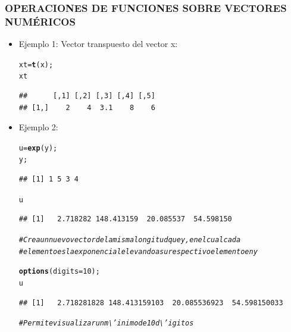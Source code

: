 \documentclass[12pt,letterpaper]{article}\usepackage[]{graphicx}\usepackage[]{color}
\makeatletter
\newcommand{\hlnum}[1]{\textcolor[rgb]{0.686,0.059,0.569}{#1}}%
\newcommand{\hlcom}[1]{\textcolor[rgb]{0.678,0.584,0.686}{\textit{#1}}}%
\newcommand{\hlstd}[1]{\textcolor[rgb]{0.345,0.345,0.345}{#1}}%
\newcommand{\hlkwb}[1]{\textcolor[rgb]{0.69,0.353,0.396}{#1}}%
\newcommand{\hlkwc}[1]{\textcolor[rgb]{0.333,0.667,0.333}{#1}}%
\newcommand{\hlkwd}[1]{\textcolor[rgb]{0.737,0.353,0.396}{\textbf{#1}}}%
\newenvironment{kframe}{%
 \def\at@end@of@kframe{}%
 \ifinner\ifhmode%
  \def\at@end@of@kframe{\end{minipage}}%
  \begin{minipage}{\columnwidth}%
 \fi\fi%
 \def\FrameCommand##1{\hskip\@totalleftmargin \hskip-\fboxsep
 \colorbox{shadecolor}{##1}\hskip-\fboxsep
     \hskip-\linewidth \hskip-\@totalleftmargin \hskip\columnwidth}%
 \MakeFramed {\advance\hsize-\width
   \@totalleftmargin\z@ \linewidth\hsize
   \@setminipage}}%
 {\par\unskip\endMakeFramed%
 \at@end@of@kframe}
\newenvironment{knitrout}{}{} %
\makeatother
\begin{document}
\subsubsection{OPERACIONES DE FUNCIONES SOBRE VECTORES NUM\'ERICOS}
\begin{itemize}
\item Ejemplo 1: Vector transpuesto del vector x:
\begin{knitrout}
\color{fgcolor}\begin{kframe}
\begin{alltt}
\hlstd{xt} \hlkwb{=} \hlkwd{t}\hlstd{(x);}
\hlstd{xt}
\end{alltt}
\begin{verbatim}
##      [,1] [,2] [,3] [,4] [,5]
## [1,]    2    4  3.1    8    6
\end{verbatim}
\end{kframe}
\end{knitrout}
\item Ejemplo 2: 
\begin{knitrout}
\color{fgcolor}\begin{kframe}
\begin{alltt}
\hlstd{u} \hlkwb{=} \hlkwd{exp}\hlstd{(y);}
\hlstd{y;}
\end{alltt}
\begin{verbatim}
## [1] 1 5 3 4
\end{verbatim}
\begin{alltt}
\hlstd{u}
\end{alltt}
\begin{verbatim}
## [1]   2.718282 148.413159  20.085537  54.598150
\end{verbatim}
\begin{alltt}
\hlcom{# Crea un nuevo vector de la misma longitud que y, en el cual cada}
\hlcom{# elemento es la exponencial elevando a su respectivo elemento en y}
\end{alltt}
\end{kframe}
\end{knitrout}
\begin{knitrout}
\color{fgcolor}\begin{kframe}
\begin{alltt}
\hlkwd{options}\hlstd{(}\hlkwc{digits}\hlstd{=}\hlnum{10}\hlstd{);}
\hlstd{u}
\end{alltt}
\begin{verbatim}
## [1]   2.718281828 148.413159103  20.085536923  54.598150033
\end{verbatim}
\begin{alltt}
\hlcom{# Permite visualizar un m\textbackslash{}'inimo de 10 d\textbackslash{}'igitos}
\end{alltt}
\end{kframe}
\end{knitrout}
\end{itemize}
\newpage
\end{document}
